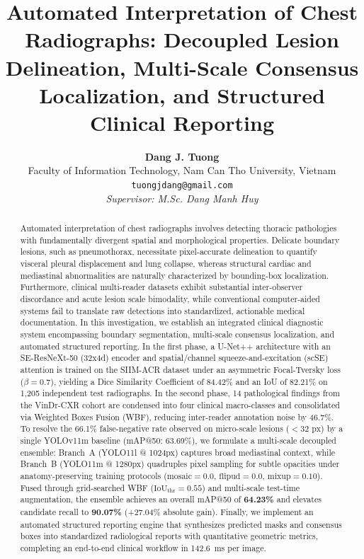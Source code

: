 \documentclass[10pt,twocolumn,letterpaper]{article}
\title{\Large \textbf{Automated Interpretation of Chest Radiographs: Decoupled Lesion Delineation, Multi-Scale Consensus Localization, and Structured Clinical Reporting}}
\author{
  \textbf{Dang J. Tuong}\\
  Faculty of Information Technology, Nam Can Tho University, Vietnam\\
  \texttt{tuongjdang@gmail.com}\\[2pt]
  \textit{Supervisor: M.Sc. Dang Manh Huy}
}
\date{}
\begin{document}
\maketitle

\begin{abstract}
Automated interpretation of chest radiographs involves detecting thoracic pathologies with fundamentally divergent spatial and morphological properties. Delicate boundary lesions, such as pneumothorax, necessitate pixel-accurate delineation to quantify visceral pleural displacement and lung collapse, whereas structural cardiac and mediastinal abnormalities are naturally characterized by bounding-box localization. Furthermore, clinical multi-reader datasets exhibit substantial inter-observer discordance and acute lesion scale bimodality, while conventional computer-aided systems fail to translate raw detections into standardized, actionable medical documentation. In this investigation, we establish an integrated clinical diagnostic system encompassing boundary segmentation, multi-scale consensus localization, and automated structured reporting. In the first phase, a U-Net++ architecture with an SE-ResNeXt-50 (32x4d) encoder and spatial/channel squeeze-and-excitation (scSE) attention is trained on the SIIM-ACR dataset under an asymmetric Focal-Tversky loss ($\beta=0.7$), yielding a Dice Similarity Coefficient of 84.42\% and an IoU of 82.21\% on 1,205 independent test radiographs. In the second phase, 14 pathological findings from the VinDr-CXR cohort are condensed into four clinical macro-classes and consolidated via Weighted Boxes Fusion (WBF), reducing inter-reader annotation noise by 46.7\%. To resolve the 66.1\% false-negative rate observed on micro-scale lesions ($<32\text{ px}$) by a single YOLOv11m baseline (mAP@50: 63.69\%), we formulate a multi-scale decoupled ensemble: Branch~A (YOLO11l @ 1024px) captures broad mediastinal context, while Branch~B (YOLO11m @ 1280px) quadruples pixel sampling for subtle opacities under anatomy-preserving training protocols ($\text{mosaic}=0.0$, $\text{flipud}=0.0$, $\text{mixup}=0.10$). Fused through grid-searched WBF ($\text{IoU}_{\text{thr}}=0.55$) and multi-scale test-time augmentation, the ensemble achieves an overall mAP@50 of \textbf{64.23\%} and elevates candidate recall to \textbf{90.07\%} (+27.04\% absolute gain). Finally, we implement an automated structured reporting engine that synthesizes predicted masks and consensus boxes into standardized radiological reports with quantitative geometric metrics, completing an end-to-end clinical workflow in 142.6~ms per image.
\end{abstract}
\end{document}
